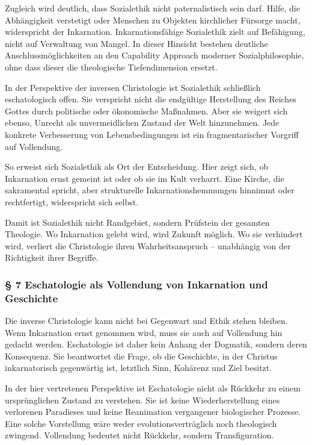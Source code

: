 \documentclass[
  ngerman,
]{article}
\begin{document}
Zugleich wird deutlich, dass Sozialethik nicht paternalistisch sein
darf. Hilfe, die Abhängigkeit verstetigt oder Menschen zu Objekten
kirchlicher Fürsorge macht, widerspricht der Inkarnation.
Inkarnationsfähige Sozialethik zielt auf Befähigung, nicht auf
Verwaltung von Mangel. In dieser Hinsicht bestehen deutliche
Anschlussmöglichkeiten an den Capability Approach moderner
Sozialphilosophie, ohne dass dieser die theologische Tiefendimension
ersetzt.

In der Perspektive der inversen Christologie ist Sozialethik schließlich
eschatologisch offen. Sie verspricht nicht die endgültige Herstellung
des Reiches Gottes durch politische oder ökonomische Maßnahmen. Aber sie
weigert sich ebenso, Unrecht als unvermeidlichen Zustand der Welt
hinzunehmen. Jede konkrete Verbesserung von Lebensbedingungen ist ein
fragmentarischer Vorgriff auf Vollendung.

So erweist sich Sozialethik als Ort der Entscheidung. Hier zeigt sich,
ob Inkarnation ernst gemeint ist oder ob sie im Kult verharrt. Eine
Kirche, die sakramental spricht, aber strukturelle Inkarnationshemmungen
hinnimmt oder rechtfertigt, widerspricht sich selbst.

Damit ist Sozialethik nicht Randgebiet, sondern Prüfstein der gesamten
Theologie. Wo Inkarnation gelebt wird, wird Zukunft möglich. Wo sie
verhindert wird, verliert die Christologie ihren Wahrheitsanspruch --
unabhängig von der Richtigkeit ihrer Begriffe.

\subsubsection{§ 7 Eschatologie als Vollendung von Inkarnation und
Geschichte}\label{eschatologie-als-vollendung-von-inkarnation-und-geschichte}

Die inverse Christologie kann nicht bei Gegenwart und Ethik stehen
bleiben. Wenn Inkarnation ernst genommen wird, muss sie auch auf
Vollendung hin gedacht werden. Eschatologie ist daher kein Anhang der
Dogmatik, sondern deren Konsequenz. Sie beantwortet die Frage, ob die
Geschichte, in der Christus inkarnatorisch gegenwärtig ist, letztlich
Sinn, Kohärenz und Ziel besitzt.

In der hier vertretenen Perspektive ist Eschatologie nicht als Rückkehr
zu einem ursprünglichen Zustand zu verstehen. Sie ist keine
Wiederherstellung eines verlorenen Paradieses und keine Reanimation
vergangener biologischer Prozesse. Eine solche Vorstellung wäre weder
evolutionsverträglich noch theologisch zwingend. Vollendung bedeutet
nicht Rückkehr, sondern Transfiguration.
\end{document}
